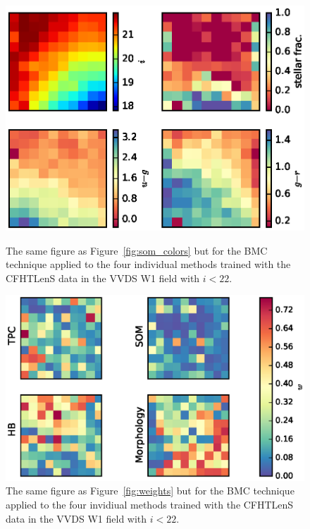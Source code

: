 \documentclass[useAMS,usenatbib]{mn2e}
\begin{document}


\begin{figure}
  \begin{minipage}[t]{0.49\linewidth}
    \includegraphics[width=\textwidth]{figures/som_colors_cut.eps}
    \caption{The same figure as Figure~\ref{fig:som_colors}
        but for the BMC technique applied to the four individual methods
        trained with the CFHTLenS data in the VVDS W1 field
        with $i < 22$.}
    \label{fig:som_colors_cut}
  \end{minipage}
  \hfill
  \begin{minipage}[t]{0.49\linewidth}
    \includegraphics[width=\textwidth]{figures/weights_cut.eps}
    \caption{The same figure as Figure~\ref{fig:weights}
        but for the BMC technique applied to the four invidiual methods
        trained with the CFHTLenS data in the VVDS W1 field
        with $i < 22$.}
    \label{fig:weights_cut}
  \end{minipage}
\end{figure}
\end{document}
